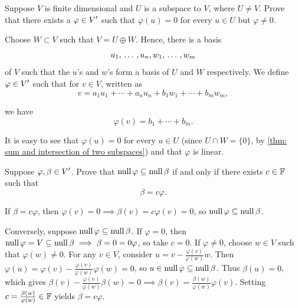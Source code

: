 \begin{xrcs}
  Suppose $V$ is finite dimensional and $U$ is a subspace to $V$, where $U \neq V$. Prove that there exists a $\varphi \in \displaystyle V'$ such that $\varphi (u) = 0$ for every $u \in U$ but $\varphi \neq 0$.

  \begin{xsol}
    Choose $W \subset V$ such that $V = U \oplus W$. Hence, there is a basis
    \begin{equation}
      u_1, {\, \ldots \,\,}, u_n, w_1, {\, \ldots \,\,}, w_m
    \end{equation}
    of $V$ such that the $u$'s and $w$'s form a basis of $U$ and $W$ respectively. We define $\varphi \in \displaystyle V'$ such that for $v \in V$, written as
    \begin{equation}
      v = a_1 u_1 + \cdots + a_n u_n + b_1 w_1 + \cdots + b_m w_m,
    \end{equation}

    we have
    \begin{equation}
      \varphi (v) = b_1 + \cdots + b_m.
    \end{equation}

    It is easy to see that $\varphi (u) = 0$ for every $u \in U$ (since $U \cap W = \{0\}$, by \ref{thm: sum and intersection of two subspaces}) and that $\varphi$ is linear.
  \end{xsol}
\end{xrcs}

\begin{xrcs}
  Suppose $\varphi, \beta \in \displaystyle V'$. Prove that $\operatorname{null} \varphi \subseteq \operatorname{null} \beta$ if and only if there exists $c \in \mathbb{F}$ such that
  \begin{equation}
    \beta = c \varphi.
  \end{equation}

\begin{xprf}
  \Leftarrowdirection If $\beta = c \varphi$, then $\varphi(v) = 0 \implies \beta(v) = c \varphi(v) = 0$, so $\operatorname{null} \varphi \subseteq \operatorname{null} \beta$.

  \Rightarrowdirection Conversely, suppose $\operatorname{null} \varphi \subseteq \operatorname{null} \beta$.
  If $\varphi = 0$, then $\operatorname{null} \varphi = V \subseteq \operatorname{null} \beta \implies \beta = 0 = 0\varphi$, so take $c = 0$.
  If $\varphi \neq 0$, choose $w \in V$ such that $\varphi(w) \neq 0$.
  For any $v \in V$, consider $u = v - \frac{\varphi(v)}{\varphi(w)} w$.
  Then $\varphi(u) = \varphi(v) - \frac{\varphi(v)}{\varphi(w)} \varphi(w) = 0$, so $u \in \operatorname{null} \varphi \subseteq \operatorname{null} \beta$.
  Thus $\beta(u) = 0$, which gives $\beta(v) - \frac{\varphi(v)}{\varphi(w)} \beta(w) = 0 \implies \beta(v) = \frac{\beta(w)}{\varphi(w)} \varphi(v)$.
  Setting $c = \frac{\beta(w)}{\varphi(w)} \in \mathbb{F}$ yields $\beta = c\varphi$.
\end{xprf}
\end{xrcs}

